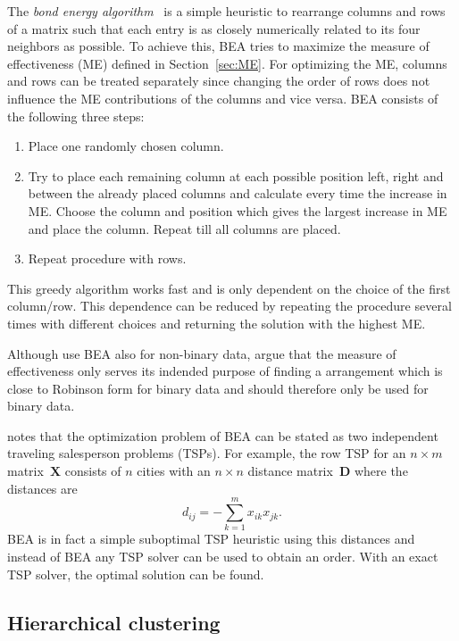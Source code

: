 \documentclass[fleqn, a4paper]{article}
\begin{document}
The \emph{bond energy algorithm}~\citep[BEA;][]{seriation:McCormick:1972} is a
simple heuristic to rearrange columns and rows of a matrix such that each entry
is as closely numerically related to its four neighbors as possible.  To
achieve this, BEA tries to maximize the measure of effectiveness (ME) defined
in Section~\ref{sec:ME}.  For optimizing the ME, columns and rows can be
treated separately since changing the order of rows does not influence the ME
contributions of the columns and vice versa. BEA consists of the
following three steps:
\begin{enumerate}
 \item Place one randomly chosen column.  
 \item Try to place each remaining column at each possible position
  left, right and between the already placed columns and calculate every
  time the increase in ME.  Choose the column and position which gives
  the largest increase in ME and place the column.  Repeat till all
  columns are placed.
 \item Repeat procedure with rows.
\end{enumerate}

This greedy algorithm works fast and is only dependent on the choice of the
first column/row. This dependence can be reduced by repeating the
procedure several times with different choices and returning the solution
with the highest ME.

Although \cite{seriation:McCormick:1972} use BEA also for non-binary data,
\cite{seriation:Arabie:1990} argue that the measure of effectiveness only
serves its indended purpose of finding a arrangement which is
close to Robinson form for binary data and should therefore only be
used for binary data.

\cite{seriation:Lenstra:1974} notes that the optimization problem of BEA
can be stated as two independent traveling salesperson problems (TSPs).
For example, the row TSP for an $n \times m$ matrix~$\mathbf{X}$
consists of $n$ cities with an $n \times n$ distance matrix~$\mathbf{D}$
where the distances are
\begin{displaymath}
    d_{ij} = -\sum_{k=1}^m x_{ik}x_{jk}.
\end{displaymath}
BEA is in fact a simple suboptimal TSP heuristic using this distances
and instead of BEA any TSP solver can be used to obtain an order.
With an exact TSP solver, the optimal solution can be found.

\subsection{Hierarchical clustering}
\label{sec:hierarchical_clustering}
\end{document}
